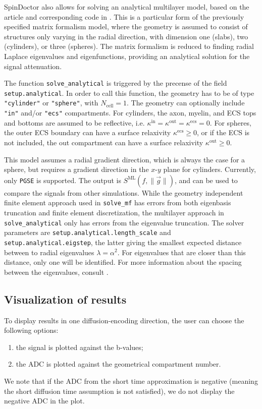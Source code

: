 \documentclass[a4paper]{article}
\begin{document}
SpinDoctor also allows for solving an analytical multilayer model, based on the article and corresponding code in \cite{grebenkov2010a}. This is a particular form of the previously specified matrix formalism model, where the geometry is assumed to consist of structures only varying in the radial direction, with dimension one (slabs), two (cylinders), or three (spheres). The matrix formalism is reduced to finding radial Laplace eigenvalues and eigenfunctions, providing an analytical solution for the signal attenuation.

The function \verb+solve_analytical+ is triggered by the precense of the field \verb+setup.analytical+. In order to call this function, the geometry has to be of type \verb+"cylinder"+ or \verb+"sphere"+, with $N_\text{cell} = 1$. The geometry can optionally include \verb+"in"+ and/or \verb+"ecs"+ compartments. For cylinders, the axon, myelin, and ECS tops and bottoms are assumed to be reflective, i.e. $\kappa^\text{in} = \kappa^\text{out} = \kappa^\text{ecs} = 0$. For spheres, the outer ECS boundary can have a surface relaxivity $\kappa^\text{ecs} \geq 0$, or if the ECS is not included, the out compartment can have a surface relaxivity $\kappa^\text{out} \geq 0$.

This model assumes a radial gradient direction, which is always the case for a sphere, but requires a gradient direction in the $x$-$y$ plane for cylinders. Currently, only \verb+PGSE+ is supported. The output is $S^\text{ML}(f, \|\vec{g}\|)$, and can be used to compare the signals from other simulations. While the geometry independent finite element approach used in \verb+solve_mf+ has errors from both eigenbasis truncation and finite element discretization, the multilayer approach in \verb+solve_analytical+ only has errors from the eigenvalue truncation. The solver parameters are \verb+setup.analytical.length_scale+ and \verb+setup.analytical.eigstep+, the latter giving the smallest expected distance between to radial eigenvalues $\lambda = \alpha^2$. For eigenvalues that are closer than this distance, only one will be identified. For more information about the spacing between the eigenvalues, consult \cite{grebenkov2010a}.


\subsection{Visualization of results}

To display results in one diffusion-encoding direction, the user can choose the following options:
\begin{enumerate}
    \item the signal is plotted against the b-values;
    \item the ADC is plotted against the geometrical compartment number.
\end{enumerate}
We note that if the ADC from the short time approximation is negative (meaning the short diffusion time assumption is not satisfied), we do not display the negative ADC in the plot.
\end{document}
